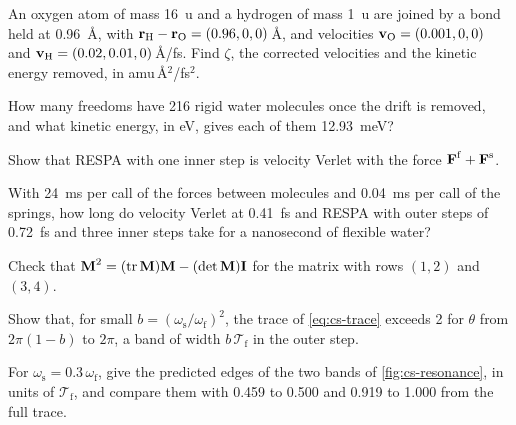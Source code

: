 \begin{exercise}
\label{ex:cs-oh}
An oxygen atom of mass \SI{16}{\amu} and a hydrogen of mass \SI{1}{\amu}
are joined by a bond held at \SI{0.96}{\angstrom}, with $\bm{\mathrm{r}}_{\mathrm H}
- \bm{\mathrm{r}}_{\mathrm O} = (0.96, 0, 0)$\,\AA, and velocities $\bm{\mathrm{v}}_{\mathrm O} = (0.001, 0, 0)$ and $\bm{\mathrm{v}}_{\mathrm H} =
(0.02, 0.01, 0)$\,\AA/fs. Find $\zeta$, the corrected velocities and the
kinetic energy removed, in amu\,\AA$^2$/fs$^2$.
\end{exercise}

\begin{exercise}
\label{ex:cs-count}
How many freedoms have 216 rigid water molecules once the drift is
removed, and what kinetic energy, in \si{\electronvolt}, gives each of them
\SI{12.93}{\milli\electronvolt}?
\end{exercise}

\begin{exercise}
\label{ex:cs-respa-one}
Show that RESPA with one inner step is velocity Verlet with the force
$\bm{\mathrm{F}}^{\mathrm f} + \bm{\mathrm{F}}^{\mathrm s}$.
\end{exercise}

\begin{exercise}
\label{ex:cs-cost}
With \SI{24}{\milli\second} per call of the forces between molecules and
\SI{0.04}{\milli\second} per call of the springs, how long do velocity
Verlet at \SI{0.41}{\femto\second} and RESPA with outer steps of
\SI{0.72}{\femto\second} and three inner steps take for a nanosecond of
flexible water?
\end{exercise}

\begin{exercise}
\label{ex:cs-matrix}
Check that $\bm{\mathrm{M}}^2 = (\operatorname{tr}\bm{\mathrm{M}})\bm{\mathrm{M}} - (\det\bm{\mathrm{M}})
\bm{\mathrm{I}}$ for the matrix with rows $(1, 2)$ and $(3, 4)$.
\end{exercise}

\begin{exercise}
\label{ex:cs-band}
Show that, for small $b = (\omega_{\mathrm s}/\omega_{\mathrm f})^2$, the
trace of \cref{eq:cs-trace} exceeds 2 for $\theta$ from $2\pi(1 - b)$ to
$2\pi$, a band of width $b\,\mathcal{T}_{\mathrm f}$ in the outer step.
\end{exercise}

\begin{exercise}
\label{ex:cs-bands}
For $\omega_{\mathrm s} = 0.3\,\omega_{\mathrm f}$, give the predicted
edges of the two bands of \cref{fig:cs-resonance}, in units of
$\mathcal{T}_{\mathrm f}$, and compare them with 0.459 to 0.500 and 0.919
to 1.000 from the full trace.
\end{exercise}

